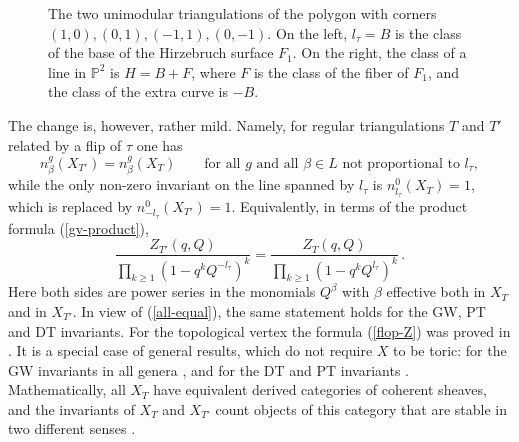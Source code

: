 \documentclass[11pt]{article}
\newcommand{\PP}{\mathbb{P}}
\begin{document}
\begin{figure}[ht]
\begin{minipage}{0.5\textwidth}\centering
{}
\end{minipage}\hfill
\begin{minipage}{0.46\textwidth}
\caption{The two unimodular triangulations of the polygon with corners
$(1,0),(0,1),(-1,1),(0,-1)$. On the left, $l_\tau=B$ is the class of the base of the Hirzebruch
surface $F_1$. On the right, the class of a line in $\PP^2$ is $H=B+F$, where $F$ is the class of
the fiber of $F_1$, and the class of the extra curve is $-B$.}\label{fig:flip}
\end{minipage}
\end{figure}

The change is, however, rather mild. Namely, for regular triangulations $T$ and $T'$
related by a flip of $\tau$ one has
\begin{equation}\label{flop-gv}
n^g_\beta(X_{T'})=n^g_\beta(X_T)\qquad\text{for all }g\text{ and all }\beta\in L\text{ not proportional to }l_\tau,
\end{equation}
while the only non-zero invariant on the line spanned by $l_\tau$ is $n^0_{l_\tau}(X_T)=1$,
which is replaced by $n^0_{-l_\tau}(X_{T'})=1$. Equivalently, in terms of the product formula
(\ref{gv-product}),
\begin{equation}\label{flop-Z}
\frac{Z_{T'}(q,Q)}{\prod_{k\geq1}(1-q^kQ^{-l_\tau})^k}=\frac{Z_T(q,Q)}{\prod_{k\geq1}(1-q^kQ^{l_\tau})^k}\,.
\end{equation}
Here both sides are power series in the monomials $Q^\beta$ with $\beta$ effective both in $X_T$
and in $X_{T'}$. In view of (\ref{all-equal}), the same statement holds for the GW, PT and DT
invariants. For the topological vertex the formula (\ref{flop-Z}) was proved in \cite{KM}. It is
a special case of general results, which do not require $X$ to be toric: for the GW invariants
in all genera \cite{LR}, and for the DT and PT invariants \cite{Toda-flop,Calabrese}.
Mathematically, all $X_T$ have equivalent derived categories of coherent sheaves, and the
invariants of $X_T$ and $X_{T'}$ count objects of this category that are stable in two different
senses \cite{Toda-flop,Calabrese}.
\end{document}
